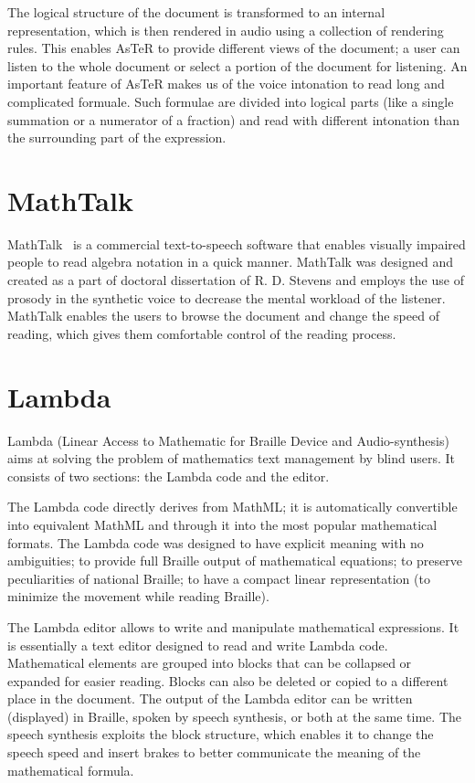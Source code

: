 \documentclass[11pt,oneside,final]{fithesis2}
\begin{document}
The logical structure of the document is transformed to an internal representation, which is then rendered in audio using a collection of rendering rules. This enables AsTeR to provide different views of the document; a user can listen to the whole document or select a portion of the document for listening. An important feature of AsTeR makes us of the voice intonation to read long and complicated formuale. Such formulae are divided into logical parts (like a single summation or a numerator of a fraction) and read with different intonation than the surrounding part of the expression. 

\section{MathTalk}
MathTalk~\cite{mathtalk:stevens1994mathtalk} is a commercial text-to-speech software that enables visually impaired people to read algebra notation in a quick manner. MathTalk was designed and created as a part of doctoral dissertation of R. D. Stevens \cite{mathtalk:stevens1996principles} and employs the use of prosody in the synthetic voice to decrease the mental workload of the listener. MathTalk enables the users to browse the document and change the speed of reading, which gives them comfortable control of the reading process.

\section{Lambda}
Lambda \cite{lambda:schweikhardt2006lambda} (Linear Access to Mathematic for Braille Device and Audio-synthesis) aims at solving the problem of mathematics text management by blind users. It consists of two sections: the Lambda code and the editor.

The Lambda code directly derives from MathML; it is automatically convertible into equivalent MathML and through it into the most popular mathematical formats. The Lambda code was designed to have explicit meaning with no ambiguities; to provide full Braille output of mathematical equations; to preserve peculiarities of national Braille; to have a compact linear representation (to minimize the movement while reading Braille).

The Lambda editor allows to write and manipulate mathematical expressions. It is essentially a text editor designed to read and write Lambda code. Mathematical elements are grouped into blocks that can be collapsed or expanded for easier reading. Blocks can also be deleted or copied to a different place in the document. The output of the Lambda editor can be written (displayed) in Braille, spoken by speech synthesis, or both at the same time. The speech synthesis exploits the block structure, which enables it to change the speech speed and insert brakes to better communicate the meaning of the mathematical formula. 
\end{document}
